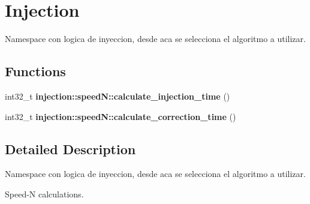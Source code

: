 \hypertarget{group__Injection}{}\section{Injection}
\label{group__Injection}


Namespace con logica de inyeccion, desde aca se selecciona el algoritmo a utilizar.  


\subsection*{Functions}
\begin{DoxyCompactItemize}
\item 
\mbox{\label{group__Injection_gafeb0836e348f7bd71ce28bdabb5b659c}} 
int32\+\_\+t {\bfseries injection\+::speed\+N\+::calculate\+\_\+injection\+\_\+time} ()
\item 
\mbox{\label{group__Injection_ga4b430f6ba7ee219e7d6afc5a8e2b0e41}} 
int32\+\_\+t {\bfseries injection\+::speed\+N\+::calculate\+\_\+correction\+\_\+time} ()
\end{DoxyCompactItemize}


\subsection{Detailed Description}
Namespace con logica de inyeccion, desde aca se selecciona el algoritmo a utilizar. 

Speed-\/N calculations.